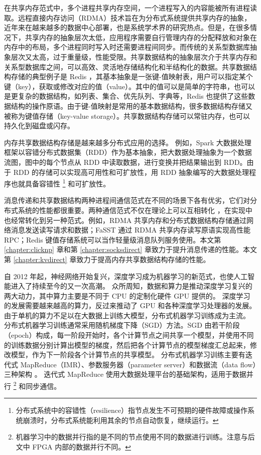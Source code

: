 在共享内存范式中，多个进程共享内存空间，一个进程写入的内容能被所有进程读取。远程直接内存访问（RDMA）技术旨在为分布式系统提供共享内存的抽象，近年来在越来越多的数据中心部署，也是系统学术界的研究热点。但是，在很多情况下，共享内存的抽象层次太低，应用程序需要自行管理内存的分配释放和对象在内存中的布局，多个进程同时写入时还需要进程间同步。而传统的关系型数据库抽象层次又太高，过于重量级，性能受限。共享数据结构的抽象层次介于共享内存和关系型数据库之间，可以高效、灵活地存储结构化和半结构化的数据。共享数据结构存储的典型例子是 Redis \cite{redis}，其基本抽象是一张键-值映射表，用户可以指定某个键（key），获取或修改对应的值（value）。其中的值可以是简单的字符串，也可以是更复杂的数据结构，如列表、集合、优先队列、字典等，Redis 也提供了这些数据结构的操作原语。由于键-值映射是常用的基本数据结构，很多数据结构存储又被称为键值存储（key-value storage）。共享数据结构存储可以常驻内存，也可以持久化到磁盘或闪存。

内存共享数据结构存储是越来越多分布式应用的选择。
例如，Spark \cite{zaharia2010spark} 大数据处理框架以容错分布式数据集（RDD）作为基本抽象，把大数据处理抽象为一个数据流图，图中的每个节点从 RDD 中读取数据，进行变换并把结果输出到 RDD。由于 RDD 的存储可以实现高可用性和可扩放性，用 RDD 抽象编写的大数据处理程序也就具备容错性 \footnote{分布式系统中的容错性（resilience）指节点发生不可预期的硬件故障或操作系统崩溃时，分布式系统能利用其余的节点自动恢复，继续运行。} 和可扩放性。

消息传递和共享数据结构两种进程间通信范式在不同的场景下各有优劣，它们对分布式系统的性能都很重要。两种通信范式不仅在理论上可以互相转化 \cite{attiya1995sharing}，在实现中也经常转化到另一种范式。例如，RDMA 共享内存和分布式数据结构存储通过网络消息发送读写请求和数据；FaSST \cite{kalia2016fasst} 通过 RDMA 共享内存读写原语实现高性能 RPC；Redis \cite{redis} 键值存储系统可以当作轻量级消息队列服务使用。本文第 \ref{chapter:clicknp} 章和第 \ref{chapter:socksdirect} 章致力于提升消息传递的性能。本文第 \ref{chapter:kvdirect} 章致力于提高内存共享数据结构存储的性能。

自 2012 年起，神经网络开始复兴，深度学习成为机器学习的新范式，也使人工智能进入了持续至今的又一次高潮。
众所周知，数据和算力是推动深度学习复兴的两大动力，其中算力主要是不同于 CPU 的定制化硬件 GPU 提供的。
深度学习的发展需要越来越高的算力，反过来推动了 GPU 和各种深度学习处理器的发展。
由于单机的算力不足以在大数据上训练大模型，分布式机器学习训练成为主流。
分布式机器学习训练通常采用随机梯度下降（SGD）方法。SGD 由若干阶段（epoch）构成，每一阶段开始时，各个计算节点之间共享一个模型，并使用不同的训练数据分别计算出模型的梯度，然后把各个计算节点的模型梯度汇总起来，修改模型，作为下一阶段各个计算节点的共享模型。
分布式机器学习训练主要有迭代式 MapReduce（IMR）、参数服务器（parameter server）和数据流（data flow）三种架构 \cite{distributed-ml}。
迭代式 MapReduce 使用大数据处理平台的基础架构，适用于数据并行 \footnote{机器学习中的数据并行指的是不同的节点使用不同的数据进行训练。注意与后文中 FPGA 内部的数据并行不同。} 和同步通信。

